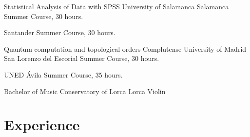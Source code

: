 \documentclass[11pt,a4paper,roman]{moderncv}
\begin{document}

{\href{http://biplot.usal.es/verano/analisis-estadistico-de-dat.html}
{Statistical Analysis of Data with SPSS}}
{University of Salamanca}
{Salamanca}
{}
{Summer Course, 30 hours.}

{Santander}
{}
{Summer Course, 30 hours.}


{Quantum computation and topological orders}
{Complutense University of Madrid}
{San Lorenzo del Escorial}{}
{Summer Course, 30 hours.}


{UNED}
{\'Avila}{}
{Summer Course, 35 hours.}

{Bachelor of Music}
{Conservatory of Lorca}
{Lorca}{}
{Violin}




\section{Experience}
\end{document}
